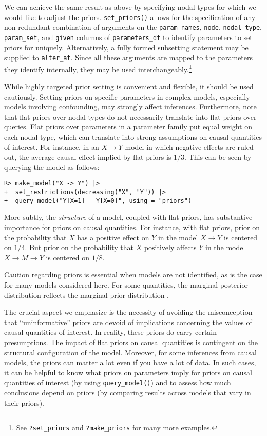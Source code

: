 \documentclass[
  11pt,
  article]{jss}
\begin{document}
We can achieve the same result as above by specifying nodal types for
which we would like to adjust the priors. \texttt{set\_priors()} allows
for the specification of any non-redundant combination of arguments on
the \texttt{param\_names}, \texttt{node}, \texttt{nodal\_type},
\texttt{param\_set}, and \texttt{given} columns of
\texttt{parameters\_df} to identify parameters to set priors for
uniquely. Alternatively, a fully formed subsetting statement may be
supplied to \texttt{alter\_at}. Since all these arguments are mapped to
the parameters they identify internally, they may be used
interchangeably.\footnote{See \texttt{?set\_priors} and
  \texttt{?make\_priors} for many more examples.}

While highly targeted prior setting is convenient and flexible, it
should be used cautiously. Setting priors on specific parameters in
complex models, especially models involving confounding, may strongly
affect inferences. Furthermore, note that flat priors over nodal types
do not necessarily translate into flat priors over queries. Flat priors
over parameters in a parameter family put equal weight on each nodal
type, which can translate into strong assumptions on causal quantities
of interest. For instance, in an \(X \rightarrow Y\) model in which
negative effects are ruled out, the average causal effect implied by
flat priors is \(1/3\). This can be seen by querying the model as
follows:

\begin{verbatim}
R> make_model("X -> Y") |>
+  set_restrictions(decreasing("X", "Y")) |>
+  query_model("Y[X=1] - Y[X=0]", using = "priors")
\end{verbatim}

More subtly, the \emph{structure} of a model, coupled with flat priors,
has substantive importance for priors on causal quantities. For
instance, with flat priors, prior on the probability that \(X\) has a
positive effect on \(Y\) in the model \(X \rightarrow Y\) is centered on
\(1/4\). But prior on the probability that \(X\) positively affects
\(Y\) in the model \(X \rightarrow M \rightarrow Y\) is centered on
\(1/8\).

Caution regarding priors is essential when models are not identified, as
is the case for many models considered here. For some quantities, the
marginal posterior distribution reflects the marginal prior distribution
\citep{poirier_revising_1998}.

The crucial aspect we emphasize is the necessity of avoiding the
misconception that ``uninformative'' priors are devoid of implications
concerning the values of causal quantities of interest. In reality,
these priors do carry certain presumptions. The impact of flat priors on
causal quantities is contingent on the structural configuration of the
model. Moreover, for some inferences from causal models, the priors can
matter a lot even if you have a lot of data. In such cases, it can be
helpful to know what priors on parameters imply for priors on causal
quantities of interest (by using \texttt{query\_model()}) and to assess
how much conclusions depend on priors (by comparing results across
models that vary in their priors).
\end{document}
